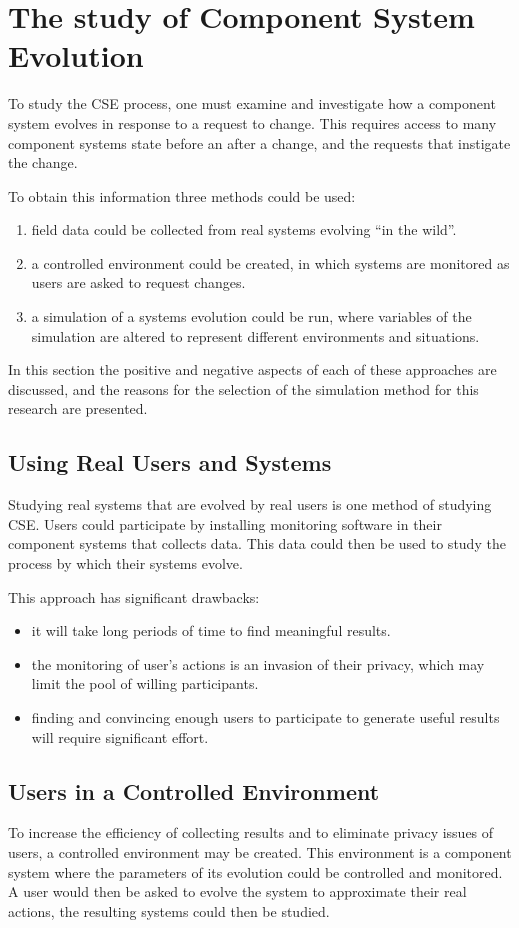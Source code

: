 \section{The study of Component System Evolution}
To study the CSE process, one must examine and investigate how a component system evolves in response to a request to change. 
This requires access to many component systems state before an after a change, and the requests that instigate the change.

To obtain this information three methods could be used:
\begin{enumerate}
  \item field data could be collected from real systems evolving ``in the wild''.
  \item a controlled environment could be created, in which systems are monitored as users are asked to request changes.
  \item a simulation of a systems evolution could be run, where variables of the simulation are altered to represent different environments and situations.
\end{enumerate} 

In this section the positive and negative aspects of each of these approaches are discussed,
and the reasons for the selection of the simulation method for this research are presented.

\subsection{Using Real Users and Systems}
Studying real systems that are evolved by real users is one method of studying CSE.
Users could participate by installing monitoring software in their component systems that collects data.
This data could then be used to study the process by which their systems evolve.

This approach  has significant drawbacks:
\begin{itemize}
  \item it will take long periods of time to find meaningful results.
  \item the monitoring of user's actions is an invasion of their privacy, which may limit the pool of willing participants.
  \item finding and convincing enough users to participate to generate useful results will require significant effort.
\end{itemize}

\subsection{Users in a Controlled Environment}
To increase the efficiency of collecting results and to eliminate privacy issues of users, a controlled environment may be created.
This environment is a component system where the parameters of its evolution could be controlled and monitored.
A user would then be asked to evolve the system to approximate their real actions, the resulting systems could then be studied.

